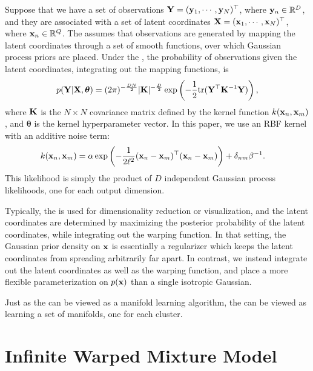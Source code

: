 Suppose that we have a set of observations
$\mathbf{Y} = ({\bf{y}}_{1},\cdots,{\bf{y}}_{N})^{\top}$,
where ${\bf{y}}_{n}\in{\mathbb R}^{D}$,
and they are associated with a set of latent coordinates
$\mathbf{X} = ({\bf{x}}_{1},\cdots,{\bf{x}}_{N})^{\top}$,
where ${\bf{x}}_{n}\in{\mathbb R}^{Q}$.
The \gplvm{} assumes that observations are generated by mapping the latent coordinates through a set of smooth functions, over which Gaussian process priors are placed.
Under the \gplvm{}, the probability of observations given the latent coordinates, integrating out the mapping functions, is
\begin{align}
p(\mathbf{Y} | \mathbf{X},\bm{\theta})  = (2 \pi)^{-\frac{DN}{2}}  |\mathbf{K}|^{-\frac{D}{2}} \exp \left( -\frac{1}{2} {\rm tr}( \mathbf{Y}^{\top} \mathbf{K}^{-1} \mathbf{Y}) \right),
\label{eq:py_x}
\end{align}
where $\mathbf{K}$ is the $N \times N$ covariance matrix defined 
by the kernel function $k({\bf{x}}_{n},{\bf{x}}_{m})$,
and $\bm{\theta}$ is the kernel hyperparameter vector.
In this paper, we use an RBF kernel with an additive noise term:
\begin{align}
k({\bf{x}}_{n},{\bf{x}}_{m}) &= \alpha \exp\left( - \frac{1}{2 \ell^2}({\bf{x}}_n - {\bf{x}}_m)^{\top} ({\bf{x}}_n - {\bf{x}}_m) \right) 
+ \delta_{nm} \beta^{-1}.
\end{align}
This likelihood is simply the product of $D$ independent Gaussian process likelihoods, one for each output dimension.

Typically, the \gplvm{} is used for dimensionality reduction or visualization, and the latent coordinates are determined by maximizing the posterior probability of the latent coordinates, while integrating out the warping function.  
In that setting, the Gaussian prior density on ${\bf{x}}$ is essentially a regularizer which keeps the latent coordinates from spreading arbitrarily far apart.  
In contrast, we instead integrate out the latent coordinates as well as the warping function, and place a more flexible parameterization on $p({\bf{x}})$ than a single isotropic Gaussian.

Just as the \gplvm{} can be viewed as a manifold learning algorithm, the \iwmm{} can be viewed as learning a set of manifolds, one for each cluster.





\section{Infinite Warped Mixture Model}

